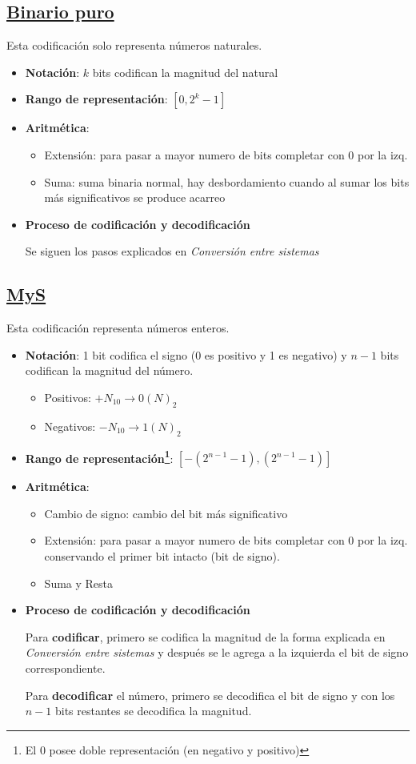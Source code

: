 \documentclass[a4paper,10pt]{book}
\begin{document}
\subsection*{\underline{Binario puro}}
Esta codificación solo representa números naturales.
\begin{itemize}
\item \textbf{Notación}: $k$ bits codifican la magnitud del natural
\item \textbf{Rango de representación}: $[0,2^k-1]$
\item \textbf{Aritmética}:
	\begin{itemize}
	\item Extensión: para pasar a mayor numero de bits completar con 0 por la izq.
	\item Suma: suma binaria normal, hay desbordamiento cuando al sumar los bits más significativos se produce acarreo
	\end{itemize}
\item \textbf{Proceso de codificación y decodificación}\par
Se siguen los pasos explicados en \textit{Conversión entre sistemas}
\end{itemize}

\subsection*{\underline{MyS}}
Esta codificación representa números enteros.
\begin{itemize}
\item \textbf{Notación}: 1 bit codifica el signo (0 es positivo y 1 es negativo) y $n-1$ bits codifican la magnitud del número.
\begin{itemize}
	\item Positivos: $+N_{10}\rightarrow 0(N)_2$
	\item Negativos: $-N_{10}\rightarrow 1(N)_2$
	\end{itemize}
\item \textbf{Rango de representación\footnote{El 0 posee doble representación (en negativo y positivo)}}: $\left[-(2^{n-1}-1),(2^{n-1}-1)\right]$
\item \textbf{Aritmética}:
	\begin{itemize}
	\item Cambio de signo: cambio del bit más significativo
	\item Extensión: para pasar a mayor numero de bits completar con 0 por la izq. conservando el primer bit intacto (bit de signo).
	\item Suma y Resta
	\end{itemize}
\item \textbf{Proceso de codificación y decodificación}\par
Para \textbf{codificar}, primero se codifica la magnitud de la forma explicada en \textit{Conversión entre sistemas} y después se le agrega a la izquierda el bit de signo correspondiente.\par
Para \textbf{decodificar} el número, primero se decodifica el bit de signo y con los $n-1$ bits restantes se decodifica la magnitud.
\end{itemize}
\end{document}
